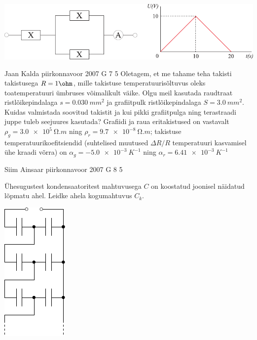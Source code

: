 \documentclass[11pt, twoside]{article}
\begin{document}
{{\begin{center}
	\includegraphics[width=\linewidth]{2009-lahg-03-yl}
\end{center}
\fi
}

{Jaan Kalda} %
{piirkonnavoor} %
{2007} %
{G 7} %
{5} %
{
\ifStatement
Oletagem, et me tahame teha takisti takistusega $R = 1 \ohm$, mille takistuse temperatuurisõltuvus oleks toatemperatuuri ümbruses võimalikult väike. Olgu meil kasutada raudtraat ristlõikepindalaga $s = \SI{0,030}{mm^2}$ ja grafiitpulk ristlõikepindalaga $S = \SI{3,0}{mm^2}$. Kuidas valmistada soovitud takistit ja kui pikki grafiitpulga ning terastraadi juppe tuleb seejuures kasutada? Grafiidi ja raua eritakistused on vastavalt $\rho_g = \SI{3,0e5}{\ohm.m}$ ning $\rho_r = \SI{9,7e-8}{\ohm.m}$; takistuse temperatuurikoefitsiendid (suhtelised muutused $\Delta R/R$ temperatuuri kasvamisel ühe kraadi võrra) on $\alpha_g = \SI{-5,0e-3}{K^{-1}}$ ning $\alpha_r = \SI{6,41e-3}{K^{-1}}$
\fi
}

{Siim Ainsaar} %
{piirkonnavoor} %
{2007} %
{G 8} %
{5} %
{
\ifStatement
Ühesugustest kondensaatoritest mahtuvusega $C$ on koostatud joonisel näidatud lõpmatu ahel. Leidke ahela kogumahtuvus $C_k$.

\begin{center}
	\includegraphics[width=0.3\linewidth]{2007-v2g-08-yl}
\end{center}
\fi
}

}
\end{document}
